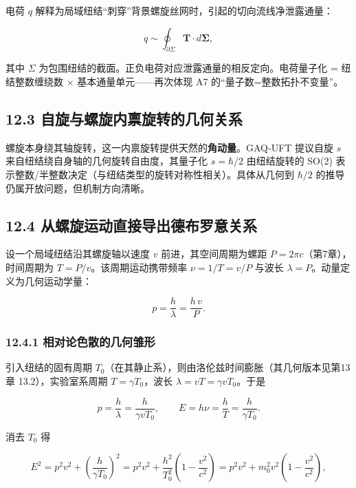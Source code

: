 电荷 \(q\)
解释为局域纽结``刺穿''背景螺旋丝网时，引起的切向流线净泄露通量：

\[
q \sim \oint_{\partial \Sigma} \mathbf{T}\cdot d\boldsymbol{\Sigma},
\]

其中 \(\Sigma\)
为包围纽结的截面。正负电荷对应泄露通量的相反定向。电荷量子化 =
纽结整数缠绕数 × 基本通量单元------再次体现 A7
的``量子数=整数拓扑不变量''。

\subsection{12.3
自旋与螺旋内禀旋转的几何关系}\label{ux81eaux65cbux4e0eux87baux65cbux5185ux7980ux65cbux8f6cux7684ux51e0ux4f55ux5173ux7cfb}

螺旋本身绕其轴旋转，这一内禀旋转提供天然的\textbf{角动量}。GAQ‑UFT
提议自旋 \(s\) 来自纽结绕自身轴的几何旋转自由度，其量子化 \(s=\hbar/2\)
由纽结旋转的 SO(2)
表示整数/半整数决定（与纽结类型的旋转对称性相关）。具体从几何到
\(\hbar/2\) 的推导仍属开放问题，但机制方向清晰。

\subsection{12.4
从螺旋运动直接导出德布罗意关系}\label{ux4eceux87baux65cbux8fd0ux52a8ux76f4ux63a5ux5bfcux51faux5fb7ux5e03ux7f57ux610fux5173ux7cfb}

设一个局域纽结沿其螺旋轴以速度 \(v\) 前进，其空间周期为螺距
\(P=2\pi c\)（第7章），时间周期为 \(T=P/v\)。该周期运动携带频率
\(\nu=1/T=v/P\) 与波长 \(\lambda=P\)。动量定义为几何运动学量：

\[
p = \frac{h}{\lambda} = \frac{h\,v}{P}.
\]

\subsubsection{12.4.1
相对论色散的几何雏形}\label{ux76f8ux5bf9ux8bbaux8272ux6563ux7684ux51e0ux4f55ux96cfux5f62}

引入纽结的固有周期
\(T_0\)（在其静止系），则由洛伦兹时间膨胀（其几何版本见第13章
13.2），实验室系周期 \(T=\gamma T_0\)，波长
\(\lambda=vT=\gamma v T_0\)。于是

\[
p=\frac{h}{\lambda}=\frac{h}{\gamma v T_0},\qquad E=h\nu=\frac{h}{T}=\frac{h}{\gamma T_0}.
\]

消去 \(T_0\) 得

\[
E^2 = p^2 v^2 + \left(\frac{h}{\gamma T_0}\right)^2
= p^2 v^2 + \frac{h^2}{T_0^2}\left(1-\frac{v^2}{c^2}\right)
= p^2 v^2 + m_0^2 v^2\left(1-\frac{v^2}{c^2}\right),
\]

